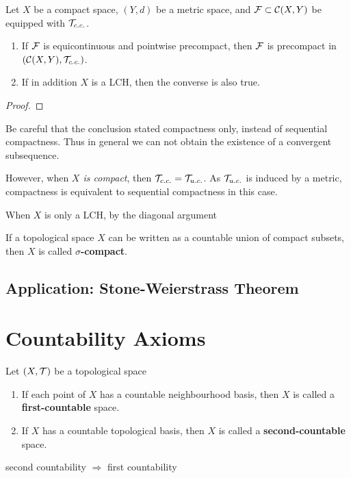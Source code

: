 \begin{theorem}
    Let $X$ be a compact space, $(Y,d)$ be a metric space, and $\mathcal{F}\subset\mathcal{C}(X,Y)$ be equipped with $\mathcal{T}_{c.c.}$.
    \begin{enumerate}[label=(\roman*)]
        \item If $\mathcal{F}$ is equicontinuous and pointwise precompact, then $\mathcal{F}$ is precompact in $(\mathcal{C}(X,Y),\mathcal{T}_{c.c.})$.
        \item If in addition $X$ is a LCH, then the converse is also true.
    \end{enumerate}
\end{theorem}
\begin{proof}
    
\end{proof}
\begin{remark}
    Be careful that the conclusion stated compactness only, instead of sequential compactness.
    Thus in general we can not obtain the existence of a convergent subsequence.
\end{remark}
However, when \textit{$X$ is compact}, then $\mathcal{T}_{c.c.}=\mathcal{T}_{u.c.}$. As $\mathcal{T}_{u.c.}$ is induced by a metric, compactness is equivalent to sequential compactness in this case.


When $X$ is only a LCH,
by the diagonal argument
\begin{definition}
    If a topological space $X$ can be written as a countable union of compact subsets, then $X$ is called \textbf{$\sigma$-compact}.
\end{definition}

\subsection{Application: Stone-Weierstrass Theorem}




\section{Countability Axioms}

\begin{definition}
    Let $(X,\mathcal{T})$ be a topological space
    \begin{enumerate}
        \item If each point of $X$ has a countable neighbourhood basis, then $X$ is called a \textbf{first-countable} space.
        \item If $X$ has a countable topological basis, then $X$ is called a \textbf{second-countable} space.
    \end{enumerate}
\end{definition}
\begin{remark}
    second countability $\Longrightarrow$ first countability
\end{remark}

